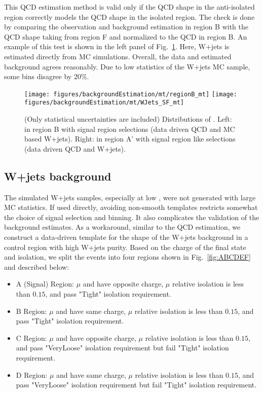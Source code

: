 This QCD estimation method is valid only if the QCD shape in the 
anti-isolated region correctly models the QCD shape in the isolated
region. The check is done by comparing the observation and background
estimation in region B with the QCD shape taking from region F and
normalized to the QCD in region B.  An example of this test is shown
in the left panel of Fig.~\ref{fig:mt_dataDrivenChecks}. Here, W+jets 
is estimated directly from MC simulations. Overall, the data and 
estimated background agrees reasonably. Due to low statistics of 
the W+jets MC sample, some bins disagree by 20\%.

\begin{figure}\centering
  \texttt{[image: figures/backgroundEstimation/mt/regionB\_mt]}
  \texttt{[image: figures/backgroundEstimation/mt/WJets\_SF\_mt]}
  \caption{\label{fig:mt_dataDrivenChecks} (Only statistical uncertainties are included) 
Distributions of \meffmtau. Left:
    in region B with signal region selections (data driven QCD and MC based W+jets).  Right:
    in region A' with signal region like selections (data driven QCD and W+jets).}
\end{figure}

\subsection{W+jets background}
\label{sec:mt_w_bkg_validation}

The simulated W+jets samples, especially at low \HT, were not
generated with large MC statistics.  If used directly, avoiding
non-smooth templates restricts somewhat the choice of signal selection
and binning.  It also complicates the validation of the background
estimates.  As a workaround, similar to the QCD estimation, we construct 
a data-driven template for the shape of the W+jets background in a control 
region with high W+jets purity. Based on the charge of the final state and 
\tauh isolation, we split the events into four regions shown in 
Fig.~\ref{fig:ABCDEF} and described below:
\begin{itemize}
  \item A (Signal) Region: $\mu$ and \tauh have opposite charge, $\mu$ relative isolation is less than $0.15$, and \tauh pass "Tight" isolation requirement.
  \item B Region: $\mu$ and \tauh have same charge, $\mu$ relative isolation is less than $0.15$, and \tauh pass "Tight" isolation requirement.
  \item C Region: $\mu$ and \tauh have opposite charge, $\mu$ relative isolation is less than $0.15$, and \tauh pass "VeryLoose" isolation requirement but fail "Tight" isolation requirement.
  \item D Region: $\mu$ and \tauh have same charge, $\mu$ relative isolation is less than $0.15$, and \tauh pass "VeryLoose" isolation requirement but fail "Tight" isolation requirement.
\end{itemize}

